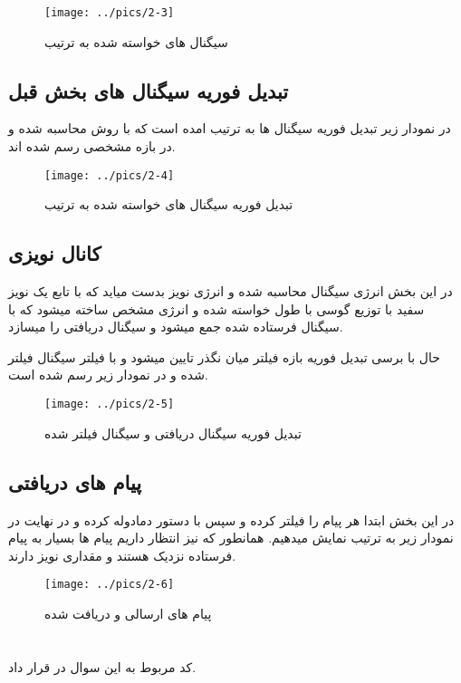 \documentclass[10pt]{article}
\begin{document}
	\begin{figure}[h]
		\centering
		\texttt{[image: ../pics/2-3]}
		\caption{سیگنال های خواسته شده به ترتیب}
		\label{fig:2-3}
	\end{figure}
	
	\newpage
	\subsection{تبدیل فوریه سیگنال های بخش قبل}
	در نمودار زیر تبدیل فوریه سیگنال ها به ترتیب امده است که با روش
	محاسبه شده و در بازه مشخصی رسم شده اند.
	\begin{figure}[h]
		\centering
		\texttt{[image: ../pics/2-4]}
		\caption{تبدیل فوریه سیگنال های خواسته شده به ترتیب}
		\label{fig:2-4}
	\end{figure}
	
	\newpage
	\subsection{کانال نویزی}
	در این بخش انرژی سیگنال محاسبه شده و انرژی نویز بدست میاید که با تابع
	یک نویز سفید با توزیع گوسی با طول خواسته شده و انرژی مشخص ساخته میشود که با سیگنال فرستاده شده جمع میشود و سیگنال دریافتی را میسازد.
	
	حال با برسی تبدیل فوریه بازه فیلتر میان نگذر تایین میشود و با فیلتر 
	سیگنال فیلتر شده و در نمودار زیر رسم شده است.
	
	\begin{figure}[h]
		\centering
		\texttt{[image: ../pics/2-5]}
		\caption{تبدیل فوریه سیگنال دریافتی و سیگنال فیلتر شده}
		\label{fig:2-5}
	\end{figure}
	
	
	\newpage
	\subsection{پیام های دریافتی}
	در این بخش ابتدا هر پیام را فیلتر کرده و سپس با دستور 
	دمادوله کرده و در نهایت در نمودار زیر به ترتیب نمایش میدهیم.
	همانطور که نیز انتظار داریم پیام ها بسیار به پیام فرستاده نزدیک هستند و مقداری نویز دارند.
	
	\begin{figure}[h]
		\centering
		\texttt{[image: ../pics/2-6]}
		\caption{پیام های ارسالی و دریافت شده}
		\label{fig:2-6}
	\end{figure}
	
	\newpage
	\section{}
	کد‌ مربوط به این سوال در 
	قرار داد.
	
\end{document}
